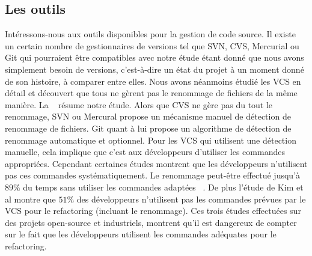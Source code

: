 \subsection{Les outils}

Intéressons-nous aux outils disponibles pour la gestion de code source. Il existe un certain nombre de gestionnaires de versions tel que SVN, CVS, Mercurial ou Git qui pourraient être compatibles avec notre étude étant donné que nous avons simplement besoin de versions, c'est-à-dire un état du projet à un moment donné de son histoire, à comparer entre elles. Nous avons néanmoins étudié les VCS en détail et découvert que tous ne gèrent pas le renommage de fichiers de la même manière. La ~ résume notre étude. Alors que CVS ne gère pas du tout le renommage, SVN ou Mercural propose un mécanisme manuel de détection de renommage de fichiers. Git quant à lui propose un algorithme de détection de renommage automatique et optionnel. Pour les VCS qui utilisent une détection manuelle, cela implique que c'est aux développeurs d'utiliser les commandes appropriées. Cependant certaines études montrent que les développeurs n'utilisent pas ces commandes systématiquement. Le renommage peut-être effectué jusqu'à $89\%$ du temps sans utiliser les commandes adaptées ~\cite{lavoie_inferring_2012,steidl_incremental_2014}. De plus l'étude de Kim et al montre que $51$\% des développeurs n'utilisent pas les commandes prévues par le VCS pour le refactoring (incluant le renommage). Ces trois études effectuées sur des projets open-source et industriels, montrent qu'il est dangereux de compter sur le fait que les développeurs utilisent les commandes adéquates pour le refactoring.\\

